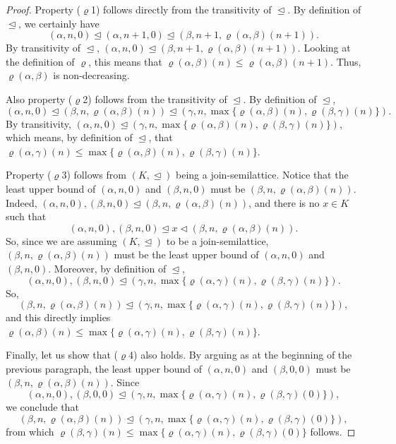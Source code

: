 \documentclass[]{amsart}
\theoremstyle{definition}
\theoremstyle{remark}
\begin{document}
\begin{proof}
Property ($\varrho$1) follows directly from the transitivity of $\trianglelefteq$. By definition of $\trianglelefteq$, we certainly have 
\[
(\alpha, n, 0) \trianglelefteq (\alpha, n+1, 0) \trianglelefteq (\beta, n+1, \varrho(\alpha, \beta)(n+1)).
\]
By transitivity of $\trianglelefteq$,  $(\alpha, n, 0) \trianglelefteq (\beta, n+1, \varrho(\alpha, \beta)(n+1))$. Looking at the definition of $\varrho$, this means that $\varrho(\alpha, \beta)(n) \le \varrho(\alpha, \beta)(n+1)$. Thus, $\varrho(\alpha, \beta)$ is non-decreasing.

Also property ($\varrho$2) follows from the transitivity of $\trianglelefteq$. By definition of $\trianglelefteq$, 
\[
(\alpha, n, 0) \trianglelefteq (\beta, n, \varrho(\alpha, \beta)(n)) \trianglelefteq (\gamma, n, \max\{\varrho(\alpha, \beta)(n), \varrho(\beta, \gamma)(n)\}).
\]
By transitivity, $(\alpha, n, 0) \trianglelefteq (\gamma, n, \max\{\varrho(\alpha, \beta)(n), \varrho(\beta, \gamma)(n)\})$, which means, by definition of $\trianglelefteq$, that $\varrho(\alpha, \gamma)(n) \le \max\{\varrho(\alpha, \beta)(n), \varrho(\beta, \gamma)(n)\}$.

Property ($\varrho$3) follows from $(K, \trianglelefteq)$ being a join-semilattice.  Notice that the least upper bound of $(\alpha, n, 0)$ and $(\beta, n, 0)$ must be $(\beta, n, \varrho(\alpha, \beta)(n))$. Indeed, $(\alpha, n, 0), (\beta, n, 0) \trianglelefteq (\beta, n, \varrho(\alpha, \beta)(n))$, and there is no $x \in K$ such that 
\[
(\alpha, n, 0), (\beta, n, 0) \trianglelefteq x \lhd (\beta, n, \varrho(\alpha, \beta)(n)).
\]
 So, since we are assuming $(K, \trianglelefteq)$ to be a join-semilattice, $(\beta, n, \varrho(\alpha, \beta)(n))$ must be the least upper bound of $(\alpha, n, 0)$ and $(\beta, n, 0)$. Moreover, by definition of $\trianglelefteq$,
\[
(\alpha, n, 0), (\beta, n, 0) \trianglelefteq (\gamma, n, \max\{\varrho(\alpha, \gamma)(n), \varrho(\beta, \gamma)(n)\}).
\]
So,
\[
(\beta, n, \varrho(\alpha, \beta)(n)) \trianglelefteq (\gamma, n, \max\{\varrho(\alpha, \gamma)(n), \varrho(\beta, \gamma)(n)\}),
\]
and this directly implies $\varrho(\alpha, \beta)(n) \le \max\{\varrho(\alpha, \gamma)(n), \varrho(\beta, \gamma)(n)\}$.

Finally, let us show that ($\varrho$4) also holds. By arguing as at the beginning of the previous paragraph, the least upper bound of $(\alpha, n, 0)$ and $(\beta, 0 ,0)$ must be $(\beta, n, \varrho(\alpha, \beta)(n))$. Since
\[
(\alpha, n, 0), (\beta, 0, 0) \trianglelefteq (\gamma, n, \max\{\varrho(\alpha, \gamma)(n), \varrho(\beta, \gamma)(0)\}),
\]
we conclude that 
\[
(\beta, n, \varrho(\alpha, \beta)(n)) \trianglelefteq (\gamma, n, \max\{\varrho(\alpha, \gamma)(n), \varrho(\beta, \gamma)(0)\}),
\]
from which $\varrho(\beta, \gamma)(n) \le \max\{\varrho(\alpha, \gamma)(n), \varrho(\beta, \gamma)(0)\}$ follows.
\end{proof}
\end{document}
